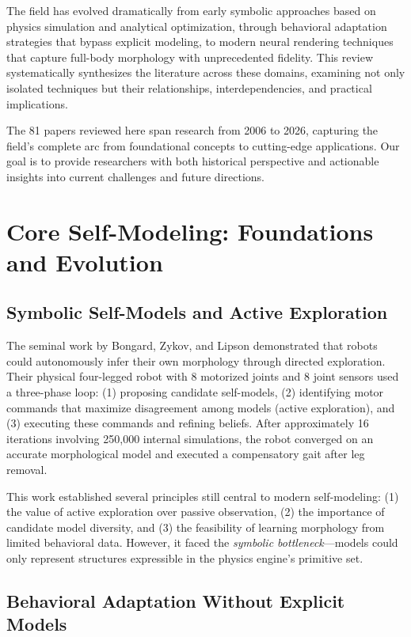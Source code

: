 \documentclass[journal]{IEEEtran}
\begin{document}
The field has evolved dramatically from early symbolic approaches based on physics simulation and analytical optimization, through behavioral adaptation strategies that bypass explicit modeling, to modern neural rendering techniques that capture full-body morphology with unprecedented fidelity. This review systematically synthesizes the literature across these domains, examining not only isolated techniques but their relationships, interdependencies, and practical implications.

The 81 papers reviewed here span research from 2006 to 2026, capturing the field's complete arc from foundational concepts to cutting-edge applications. Our goal is to provide researchers with both historical perspective and actionable insights into current challenges and future directions.

\section{Core Self-Modeling: Foundations and Evolution}

\subsection{Symbolic Self-Models and Active Exploration}

The seminal work by Bongard, Zykov, and Lipson \cite{bongard2006} demonstrated that robots could autonomously infer their own morphology through directed exploration. Their physical four-legged robot with 8 motorized joints and 8 joint sensors used a three-phase loop: (1) proposing candidate self-models, (2) identifying motor commands that maximize disagreement among models (active exploration), and (3) executing these commands and refining beliefs. After approximately 16 iterations involving 250,000 internal simulations, the robot converged on an accurate morphological model and executed a compensatory gait after leg removal.

This work established several principles still central to modern self-modeling: (1) the value of active exploration over passive observation, (2) the importance of candidate model diversity, and (3) the feasibility of learning morphology from limited behavioral data. However, it faced the \textit{symbolic bottleneck}---models could only represent structures expressible in the physics engine's primitive set.

\subsection{Behavioral Adaptation Without Explicit Models}
\end{document}
